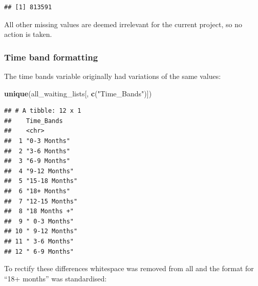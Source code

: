 \documentclass[
  12pt,
]{article}
\newenvironment{Shaded}{\begin{snugshade}}{\end{snugshade}}
\newcommand{\KeywordTok}[1]{\textcolor[rgb]{0.13,0.29,0.53}{\textbf{#1}}}
\newcommand{\NormalTok}[1]{#1}
\newcommand{\OperatorTok}[1]{\textcolor[rgb]{0.81,0.36,0.00}{\textbf{#1}}}
\newcommand{\StringTok}[1]{\textcolor[rgb]{0.31,0.60,0.02}{#1}}
\begin{document}
\begin{verbatim}
## [1] 813591
\end{verbatim}

\normalsize

All other missing values are deemed irrelevant for the current project, so no action is taken.

\hypertarget{time-band-formatting}{%
\subsubsection{Time band formatting}\label{time-band-formatting}}

The time bands variable originally had variations of the same values:
\small

\begin{Shaded}
\begin{Highlighting}[]
\KeywordTok{unique}\NormalTok{(all\_waiting\_lists[, }\KeywordTok{c}\NormalTok{(}\StringTok{"Time\_Bands"}\NormalTok{)])}
\end{Highlighting}
\end{Shaded}

\begin{verbatim}
## # A tibble: 12 x 1
##    Time_Bands    
##    <chr>         
##  1 "0-3 Months"  
##  2 "3-6 Months"  
##  3 "6-9 Months"  
##  4 "9-12 Months" 
##  5 "15-18 Months"
##  6 "18+ Months"  
##  7 "12-15 Months"
##  8 "18 Months +" 
##  9 " 0-3 Months" 
## 10 " 9-12 Months"
## 11 " 3-6 Months" 
## 12 " 6-9 Months"
\end{verbatim}

\normalsize

To rectify these differences whitespace was removed from all and the format for ``18+ months'' was standardised:

\begin{Shaded}
\end{Shaded}
\end{document}
